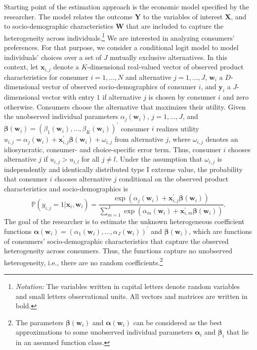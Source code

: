 \documentclass[a4paper, 12pt]{article}
\begin{document}
Starting point of the estimation approach is the economic model specified by the researcher. The model relates the outcome $\bm{Y}$ to the variables of interest $\bm{X}$, and to socio-demographic characteristics $\bm{W}$ that are included to capture the heterogeneity across individuals.\footnote{\textit{Notation:} The variables written in capital letters denote random variables and small letters observational units. All vectors and matrices are written in bold.}
We are interested in analyzing consumers' preferences. For that purpose, we consider a conditional logit  model to model individuals' choices over a set of $J$ mutually exclusive alternatives.
In this context, let $\bm{x}_{i,j}$ denote a $K$-dimensional real-valued vector of observed product characteristics for consumer $i=1,\ldots,N$ and alternative $j=1,\ldots,J$, $\bm{w}_i$ a  $D$-dimensional vector of observed socio-demographics of consumer $i$, and $\bm{y}_i$ a $J$-dimensional vector with entry $1$ if alternative $j$ is chosen by consumer $i$ and zero otherwise. 
Consumers choose the alternative that maximizes their utility. Given %
the unobserved individual parameters $\alpha_j(\bm{w}_i)$, $j=1,\ldots,J$, and $\bm{\beta}(\bm{w}_i) = \left(\beta_1(\bm{w}_i),\ldots,\beta_K(\bm{w}_i) \right)^{\prime}$ consumer $i$ realizes utility $u_{i,j}=\alpha_j(\bm{w}_i)+\bm{x}_{i,j}^{\prime}\bm{\beta}(\bm{w}_i)+\omega_{i,j}$ from alternative $j$, where $\omega_{i,j}$ denotes an idiosyncratic, consumer- and choice-specific error term. Thus, consumer $i$ chooses alternative $j$ if $u_{i,j}>u_{i,l}$ for all $j\neq l$. Under the assumption that $\omega_{i,j}$ is independently and identically distributed type I extreme value, the probability that consumer $i$ chooses alternative $j$ conditional on the observed product characteristics and socio-demographics is
\begin{equation}\label{eqDL:logit_model}
\mathbb{P}\left(y_{i,j}=1\vert \bm{x}_i, \bm{w}_i\right)=\frac{\exp\left(\alpha_j\left(\bm{w}_i\right) + \bm{x}^{\prime}_{i,j}\bm{\beta}\left(\bm{w}_i\right)\right)}{\sum_{m=1}^J\exp\left(\alpha_m\left(\bm{w}_i\right) + \bm{x}^{\prime}_{i,m}\bm{\beta}\left(\bm{w}_i\right)\right)}.
\end{equation}
The goal of the researcher is to estimate the unknown heterogeneous coefficient functions $\bm{\alpha}(\bm{w}_i)= \left(\alpha_1(\bm{w}_i),\ldots,\alpha_J(\bm{w}_i) \right)^{\prime}$ and $\bm{\beta}(\bm{w}_i)$, which are functions of consumers' socio-demographic characteristics that capture the observed heterogeneity across consumers. Thus, the functions capture no unobserved heterogeneity, i.e., there are no random coefficients.\footnote{The parameters $\bm{\beta}(\bm{w}_i)$ and $\bm{\alpha}(\bm{w}_i)$ can be considered as the best approximations to some unobserved individual parameters $\bm{\alpha}_i$ and $\bm{\beta}_i$ that lie in an assumed function class.} \\
\end{document}
